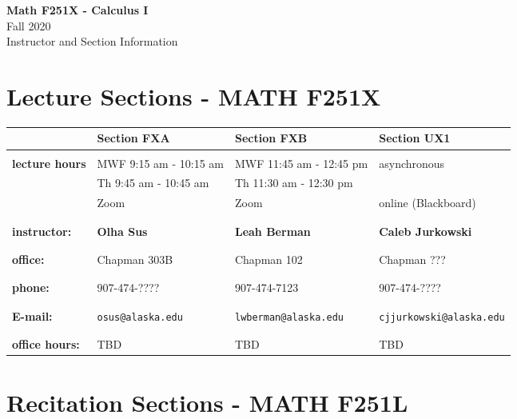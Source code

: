 \documentclass[11pt,fleqn]{article}
\begin{document}
\setcounter{secnumdepth}{0}

\vspace*{-1in}
\begin{center}
\large{\textbf{Math F251X - Calculus I}}\\

\large{Fall 2020\\ Instructor and Section Information}
\end{center}

\vfill

\section{Lecture Sections - MATH F251X}

\begin{tabular}{| l || l | l | l |}
\hline \hline
&Section FXA&Section FXB&Section UX1\\
\hline \hline
&&&\\
\textbf{lecture hours}&MWF 9:15 am - 10:15 am&MWF 11:45 am - 12:45 pm& 
asynchronous\\
&Th 9:45 am - 10:45 am& Th 11:30 am - 12:30 pm & \\
&Zoom & Zoom &  online (Blackboard)\\
&&&\\
\hline
&&&\\
\textbf{instructor:}&\textbf{Olha Sus}&\textbf{Leah Berman}&\textbf{Caleb Jurkowski}\\
&&&\\
\hline
&&&\\
\textbf{office:}&Chapman 303B&Chapman 102& Chapman ???\\
&&&\\
\hline
&&&\\
\textbf{phone:}&907-474-????&907-474-7123&907-474-????\\ 
&&&\\\hline
&&&\\
\textbf{E-mail:}&\texttt{osus@alaska.edu} &\texttt{lwberman@alaska.edu} &\texttt{cjjurkowski@alaska.edu}\\ &&&\\ \hline
&&&\\ \textbf{office hours:}&TBD&TBD&TBD\\ 
 \hline
\end{tabular}

\vfill

\section{Recitation Sections - MATH F251L}
\end{document}
